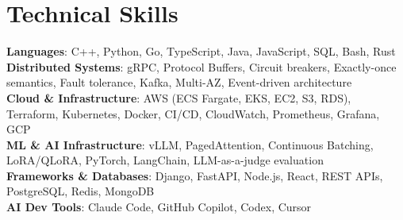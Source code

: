 \documentclass[letterpaper,11pt]{article}
\begin{document}
\section{Technical Skills}
\vspace{-7pt}
\begin{itemize}
[leftmargin=0.15in, label={}]\small{\item{
        \textbf{Languages}{: C++, Python, Go, TypeScript, Java, JavaScript, SQL, Bash, Rust} \\
        \textbf{Distributed Systems}{: gRPC, Protocol Buffers, Circuit breakers, Exactly-once semantics, Fault tolerance, Kafka, Multi-AZ, Event-driven architecture} \\
        \textbf{Cloud \& Infrastructure}{: AWS (ECS Fargate, EKS, EC2, S3, RDS), Terraform, Kubernetes, Docker, CI/CD, CloudWatch, Prometheus, Grafana, GCP} \\
        \textbf{ML \& AI Infrastructure}{: vLLM, PagedAttention, Continuous Batching, LoRA/QLoRA, PyTorch, LangChain, LLM-as-a-judge evaluation} \\
        \textbf{Frameworks \& Databases}{: Django, FastAPI, Node.js, React, REST APIs, PostgreSQL, Redis, MongoDB} \\
        \textbf{AI Dev Tools}{: Claude Code, GitHub Copilot, Codex, Cursor} \\
}}
\end{itemize}
\end{document}
